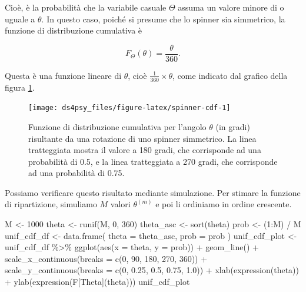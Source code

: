\documentclass[
  11pt,
]{krantz}
\makeatletter
\newenvironment{Shaded}{\begin{snugshade}}{\end{snugshade}}
\newcommand{\AttributeTok}[1]{\textcolor[rgb]{0.61,0.61,0.61}{#1}}
\newcommand{\DecValTok}[1]{\textcolor[rgb]{0.06,0.06,0.06}{#1}}
\newcommand{\FloatTok}[1]{\textcolor[rgb]{0.06,0.06,0.06}{#1}}
\newcommand{\FunctionTok}[1]{\textcolor[rgb]{0,0,0}{#1}}
\newcommand{\NormalTok}[1]{#1}
\newcommand{\OtherTok}[1]{\textcolor[rgb]{0.37,0.37,0.37}{#1}}
\newcommand{\SpecialCharTok}[1]{\textcolor[rgb]{0,0,0}{#1}}
\newenvironment{kframe}{%
\medskip{}
\setlength{\fboxsep}{.8em}
 \def\at@end@of@kframe{}%
 \ifinner\ifhmode%
  \def\at@end@of@kframe{\end{minipage}}%
  \begin{minipage}{\columnwidth}%
 \fi\fi%
 \def\FrameCommand##1{\hskip\@totalleftmargin \hskip-\fboxsep
 \colorbox{shadecolor}{##1}\hskip-\fboxsep
     \hskip-\linewidth \hskip-\@totalleftmargin \hskip\columnwidth}%
 \MakeFramed {\advance\hsize-\width
   \@totalleftmargin\z@ \linewidth\hsize
   \@setminipage}}%
 {\par\unskip\endMakeFramed%
 \at@end@of@kframe}
\renewenvironment{Shaded}{\begin{kframe}}{\end{kframe}}
\theoremstyle{definition}
\theoremstyle{definition}
\theoremstyle{definition}
\theoremstyle{definition}
\theoremstyle{remark}
\makeatother
\begin{document}
Cioè, è la probabilità che la variabile casuale \(\Theta\) assuma un valore minore di o uguale a \(\theta\). In questo caso, poiché si presume che lo spinner sia simmetrico, la funzione di distribuzione cumulativa è

\[
F_{\Theta}(\theta) = \frac{\theta}{360}.
\]

Questa è una funzione lineare di \(\theta\), cioè \(\frac{1}{360} \times \theta\), come indicato dal grafico della figura \ref{fig:spinner-cdf}.

\begin{figure}[h]

{\centering \texttt{[image: ds4psy\_files/figure-latex/spinner-cdf-1]} 

}

\caption{Funzione di distribuzione cumulativa per l'angolo $\theta$ (in gradi) risultante da una rotazione di uno spinner simmetrico. La linea tratteggiata mostra il valore a 180 gradi, che corrisponde ad una probabilità di 0.5, e la linea tratteggiata a 270 gradi, che corrisponde ad una probabilità di 0.75.}\label{fig:spinner-cdf}
\end{figure}

Possiamo verificare questo risultato mediante simulazione. Per stimare la funzione di ripartizione, simuliamo \(M\) valori \(\theta^{(m)}\) e poi li ordiniamo in ordine crescente.

\begin{Shaded}
\begin{Highlighting}[]
\NormalTok{M }\OtherTok{\textless{}{-}} \DecValTok{1000}
\NormalTok{theta }\OtherTok{\textless{}{-}} \FunctionTok{runif}\NormalTok{(M, }\DecValTok{0}\NormalTok{, }\DecValTok{360}\NormalTok{)}
\NormalTok{theta\_asc }\OtherTok{\textless{}{-}} \FunctionTok{sort}\NormalTok{(theta)}
\NormalTok{prob }\OtherTok{\textless{}{-}}\NormalTok{ (}\DecValTok{1}\SpecialCharTok{:}\NormalTok{M) }\SpecialCharTok{/}\NormalTok{ M}
\NormalTok{unif\_cdf\_df }\OtherTok{\textless{}{-}} \FunctionTok{data.frame}\NormalTok{(}
  \AttributeTok{theta =}\NormalTok{ theta\_asc,}
  \AttributeTok{prob =}\NormalTok{ prob}
\NormalTok{)}
\NormalTok{unif\_cdf\_plot }\OtherTok{\textless{}{-}}
\NormalTok{  unif\_cdf\_df }\SpecialCharTok{\%\textgreater{}\%}
  \FunctionTok{ggplot}\NormalTok{(}\FunctionTok{aes}\NormalTok{(}\AttributeTok{x =}\NormalTok{ theta, }\AttributeTok{y =}\NormalTok{ prob)) }\SpecialCharTok{+}
  \FunctionTok{geom\_line}\NormalTok{() }\SpecialCharTok{+}
  \FunctionTok{scale\_x\_continuous}\NormalTok{(}\AttributeTok{breaks =} \FunctionTok{c}\NormalTok{(}\DecValTok{0}\NormalTok{, }\DecValTok{90}\NormalTok{, }\DecValTok{180}\NormalTok{, }\DecValTok{270}\NormalTok{, }\DecValTok{360}\NormalTok{)) }\SpecialCharTok{+}
  \FunctionTok{scale\_y\_continuous}\NormalTok{(}\AttributeTok{breaks =} \FunctionTok{c}\NormalTok{(}\DecValTok{0}\NormalTok{, }\FloatTok{0.25}\NormalTok{, }\FloatTok{0.5}\NormalTok{, }\FloatTok{0.75}\NormalTok{, }\FloatTok{1.0}\NormalTok{)) }\SpecialCharTok{+}
  \FunctionTok{xlab}\NormalTok{(}\FunctionTok{expression}\NormalTok{(theta)) }\SpecialCharTok{+}
  \FunctionTok{ylab}\NormalTok{(}\FunctionTok{expression}\NormalTok{(F[Theta](theta)))}
\NormalTok{unif\_cdf\_plot}
\end{Highlighting}
\end{Shaded}
\end{document}
